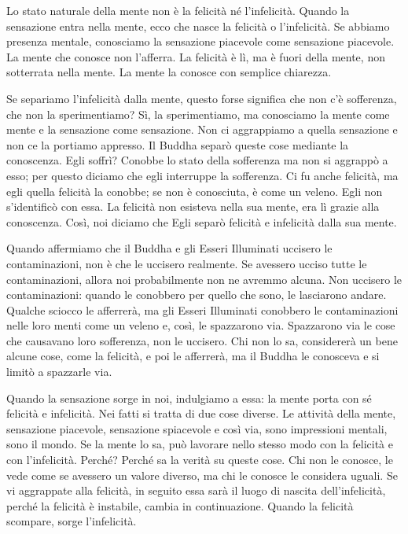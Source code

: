 Lo stato naturale della mente non è la felicità né l'infelicità. Quando
la sensazione entra nella mente, ecco che nasce la felicità o
l'infelicità. Se abbiamo presenza mentale, conosciamo la sensazione
piacevole come sensazione piacevole. La mente che conosce non l'afferra.
La felicità è lì, ma è fuori della mente, non sotterrata nella mente. La
mente la conosce con semplice chiarezza.

Se separiamo l'infelicità dalla mente, questo forse significa che non
c'è sofferenza, che non la sperimentiamo? Sì, la sperimentiamo, ma
conosciamo la mente come mente e la sensazione come sensazione. Non ci
aggrappiamo a quella sensazione e non ce la portiamo appresso. Il Buddha
separò queste cose mediante la conoscenza. Egli soffrì? Conobbe lo stato
della sofferenza ma non si aggrappò a esso; per questo diciamo che egli
interruppe la sofferenza. Ci fu anche felicità, ma egli quella felicità
la conobbe; se non è conosciuta, è come un veleno. Egli non s'identificò
con essa. La felicità non esisteva nella sua mente, era lì grazie alla
conoscenza. Così, noi diciamo che Egli separò felicità e infelicità
dalla sua mente.

Quando affermiamo che il Buddha e gli Esseri Illuminati uccisero le
contaminazioni, non è che le uccisero realmente. Se avessero ucciso
tutte le contaminazioni, allora noi probabilmente non ne avremmo alcuna.
Non uccisero le contaminazioni: quando le conobbero per quello che sono,
le lasciarono andare. Qualche sciocco le afferrerà, ma gli Esseri
Illuminati conobbero le contaminazioni nelle loro menti come un veleno
e, così, le spazzarono via. Spazzarono via le cose che causavano loro
sofferenza, non le uccisero. Chi non lo sa, considererà un bene alcune
cose, come la felicità, e poi le afferrerà, ma il Buddha le conosceva e
si limitò a spazzarle via.

Quando la sensazione sorge in noi, indulgiamo a essa: la mente porta con
sé felicità e infelicità. Nei fatti si tratta di due cose diverse. Le
attività della mente, sensazione piacevole, sensazione spiacevole e così
via, sono impressioni mentali, sono il mondo. Se la mente lo sa, può
lavorare nello stesso modo con la felicità e con l'infelicità. Perché?
Perché sa la verità su queste cose. Chi non le conosce, le vede come se
avessero un valore diverso, ma chi le conosce le considera uguali. Se vi
aggrappate alla felicità, in seguito essa sarà il luogo di nascita
dell'infelicità, perché la felicità è instabile, cambia in
continuazione. Quando la felicità scompare, sorge l'infelicità.

